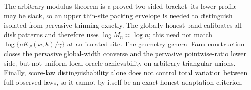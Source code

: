 The arbitrary-modulus theorem is a proved two-sided bracket: its lower profile may be slack, so an upper thin-site packing envelope is needed to distinguish isolated from pervasive thinning exactly. The globally honest band calibrates all disk patterns and therefore uses \(\log M_n\asymp\log n\); this need not match \(\log\{eK_P(x,h)/\gamma\}\) at an isolated site. The geometry-general Fano construction closes the pervasive global-width converse and the pervasive pointwise-ratio lower side, but not uniform local-oracle achievability on arbitrary triangular unions. Finally, score-law distinguishability alone does not control total variation between full observed laws, so it cannot by itself be an exact honest-adaptation criterion.